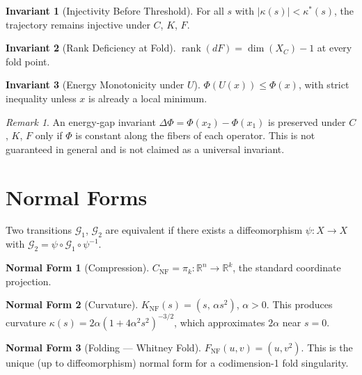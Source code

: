 \documentclass[12pt, oneside]{book}
\theoremstyle{plain}
\theoremstyle{definition}
\newtheorem{invariant}{Invariant}[section]
\newtheorem{normalform}{Normal Form}[section]
\theoremstyle{remark}
\newtheorem{remark}{Remark}[section]
\begin{document}
\begin{invariant}[Injectivity Before Threshold]
For all $s$ with $|\kappa(s)| < \kappa^*(s)$, the trajectory remains
injective under $C$, $K$, $F$.
\end{invariant}

\begin{invariant}[Rank Deficiency at Fold]
$\operatorname{rank}(dF) = \dim(X_C) - 1$ at every fold point.
\end{invariant}

\begin{invariant}[Energy Monotonicity under $U$]
$\Phi(U(x)) \le \Phi(x)$, with strict inequality unless $x$ is
already a local minimum.
\end{invariant}

\begin{remark}
An energy-gap invariant $\Delta\Phi = \Phi(x_2) - \Phi(x_1)$ is
preserved under $C$, $K$, $F$ only if $\Phi$ is constant along the
fibers of each operator. This is not guaranteed in general and is not
claimed as a universal invariant.
\end{remark}

\section{Normal Forms}

Two transitions $\mathcal{G}_1$, $\mathcal{G}_2$ are equivalent if
there exists a diffeomorphism $\psi : X \to X$ with
$\mathcal{G}_2 = \psi \circ \mathcal{G}_1 \circ \psi^{-1}$.

\begin{normalform}[Compression]
$C_{\mathrm{NF}} = \pi_k : \mathbb{R}^n \to \mathbb{R}^k$, the
standard coordinate projection.
\end{normalform}

\begin{normalform}[Curvature]
$K_{\mathrm{NF}}(s) = (s,\, \alpha s^2)$, $\alpha > 0$. This
produces curvature
$\kappa(s) = 2\alpha(1 + 4\alpha^2 s^2)^{-3/2}$, which approximates
$2\alpha$ near $s = 0$.
\end{normalform}

\begin{normalform}[Folding --- Whitney Fold]
$F_{\mathrm{NF}}(u,v) = (u, v^2)$. This is the unique (up to
diffeomorphism) normal form for a codimension-1 fold singularity.
\end{normalform}
\end{document}
